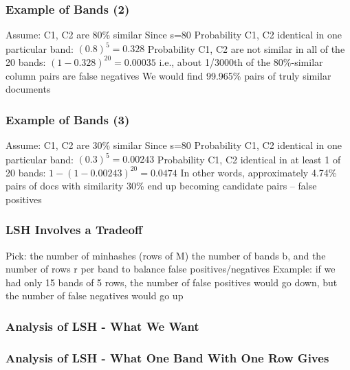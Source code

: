 \documentclass[svgnames]{beamer}
\begin{document}
  
\begin{frame} \frametitle{Example of Bands (2)}

Assume: C1, C2 are 80\% similar
Since s=80%
Probability C1, C2 identical in one particular band: $(0.8)^5 = 0.328$
Probability C1, C2 are not similar in all of the 20 bands: $(1-0.328)^{20} = 0.00035$
  i.e., about 1/3000th of the 80\%-similar column pairs are false negatives
  We would find 99.965\% pairs of truly similar documents
  
\end{frame}

  
\begin{frame} \frametitle{Example of Bands (3)}

Assume: C1, C2 are 30\% similar
Since s=80%
Probability C1, C2 identical in one particular band: $(0.3)^5 = 0.00243$
Probability C1, C2 identical in at least 1 of 20 bands: $1 - (1 - 0.00243)^{20} = 0.0474$
  In other words, approximately 4.74\% pairs of docs with similarity 30\% end up becoming candidate pairs -- false positives
  
\end{frame}

  
\begin{frame} \frametitle{LSH Involves a Tradeoff}

Pick:
  the number of minhashes (rows of M)
  the number of bands b, and
  the number of rows r per band
to balance false positives/negatives
Example: if we had only 15 bands of 5 rows, the number of false positives would go down, but the number of false negatives would go up

\end{frame}

  
\begin{frame} \frametitle{Analysis of LSH - What We Want}


\end{frame}

  
\begin{frame} \frametitle{Analysis of LSH - What One Band With One Row Gives}


\end{frame}
\end{document}

